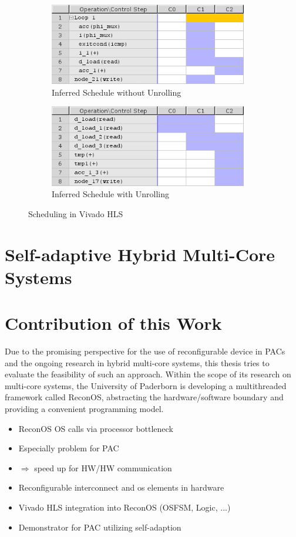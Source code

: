 \begin{figure}[tb]
	\centering
	\begin{subfigure}{0.49\textwidth}
		\centering
		\includegraphics[width=0.95\textwidth]{../figures/hls_n}
		\caption{Inferred Schedule without Unrolling}
		\label{fig:hls_n}
	\end{subfigure}
	\begin{subfigure}{0.49\textwidth}
		\centering
		\includegraphics[width=0.95\textwidth]{../figures/hls_u}
		\caption{Inferred Schedule with Unrolling}
		\label{fig:hls_u}
	\end{subfigure}
	\caption{Scheduling in Vivado HLS}
	\label{fig:hls}
\end{figure}

\section{Self-adaptive Hybrid Multi-Core Systems}

\section{Contribution of this Work}
Due to the promising perspective for the use of reconfigurable device  in
\acp{PAC} and the ongoing research in hybrid multi-core systems, this thesis
tries to evaluate the feasibility of such an approach. Within the scope of its
research on multi-core systems, the University of Paderborn is developing a
multithreaded framework called ReconOS, abstracting the hardware/software
boundary and providing a convenient programming model.

\begin{itemize}
\item ReconOS OS calls via processor bottleneck
\item Especially problem for PAC
\item $\Rightarrow$ speed up for HW/HW communication
\item Reconfigurable interconnect and os elements in hardware
\item Vivado HLS integration into ReconOS (OSFSM, Logic, ...)
\item Demonstrator for PAC utilizing self-adaption
\end{itemize}